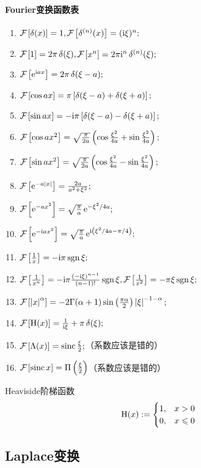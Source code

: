 \paragraph{Fourier变换函数表}
\begin{enumerate}
	\item $\cf{\delta(x)}=1,$\qquad$\cf{\delta^{(n)}(x)}=(\i\xi)^n;$
	\item $\cf 1=2\pi\vd(\xi),$\qquad$\cf{x^n}=2\pi\i^n\vd^{(n)}(\xi);$
	\item $\cf{\e{\i ax}}=2\pi\vd(\xi-a);$
	\item $\cf{\cos ax}=\pi\fkh{\delta(\xi-a)+\delta(\xi+a)};$
	\item $\cf{\sin ax}=-\i\pi\fkh{\delta(\xi-a)-\delta(\xi+a)};$
	\item $\cf{\cos ax^2}=\sqrt{\frac\pi{2a}}\kh{\cos\frac{\xi^2}{4a}+\sin\frac{\xi^2}{4a}};$
	\item $\cf{\sin ax^2}=\sqrt{\frac\pi{2a}}\kh{\cos\frac{\xi^2}{4a}-\sin\frac{\xi^2}{4a}};$
	\item $\cf{\e{-a\abs x}}=\frac{2a}{a^2+\xi^2};$
	\item $\cf{\e{-ax^2}}=\sqrt{\frac\pi{a}}\e{-\xi^2/4a};$
	\item $\cf{\e{-\i ax^2}}=\sqrt{\frac\pi{a}}\e{\i\kh{\xi^2/4a-\pi/4}};$
	\item $\cf{\frac1x}=-\i\pi\sgn\xi;$
	\item $\cf{\frac1{x^n}}=-\i\pi\frac{(-\i\xi)^{n-1}}{(n-1)!}\sgn\xi,$\qquad$\cf{\frac1{x^2}}=-\pi\xi\sgn\xi;$
	\item $\cf{\abs x^\alpha}=-2\Gamma(\alpha+1)\sin\kh{\frac{\pi\alpha}2}\abs\xi^{-1-\alpha};$
	\item $\cf{\Heaviside(x)}=\frac1{\i\xi}+\pi\vd(\xi);$
	\item $\cf{\Lambda(x)}=\sinc\frac\xi{2};$（系数应该是错的）
	\item $\cf{\sinc x}=\Pi\kh{\frac\xi{2}}$（系数应该是错的）
\end{enumerate}
Heaviside阶梯函数
\[
	\Heaviside(x):=\begin{cases}
	1,&x>0\\
	0,&x\leqslant 0
	\end{cases}
\]
\subsection{Laplace变换}
